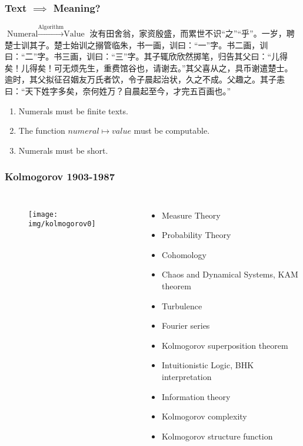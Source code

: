 \documentclass[UTF8,11pt,colorlinks,compress,openany]{beamer}%
\begin{document}
\begin{frame}\frametitle{Text $\implies$ Meaning?}
\begin{block}{$\mbox{Numeral}\xrightarrow{\text{Algorithm}}\mbox{Value}$}
汝有田舍翁，家资殷盛，而累世不识“之”“乎”。一岁，聘楚士训其子。楚士始训之搦管临朱，书一画，训曰：“一”字。书二画，训曰：“二”字。书三画，训曰：“三”字。其子辄欣欣然掷笔，归告其父曰：“儿得矣！儿得矣！可无烦先生，重费馆谷也，请谢去。”其父喜从之，具币谢遣楚士。\\
逾时，其父拟征召姻友万氏者饮，令子晨起治状，久之不成。父趣之。其子恚曰：“天下姓字多矣，奈何姓万？自晨起至今，才完五百画也。”
\end{block}
\begin{enumerate}
	\item Numerals must be finite texts.
	\item The function $numeral\mapsto value$ must be computable.
	\item Numerals must be short.
\end{enumerate}
\end{frame}

\begin{frame}\frametitle{Kolmogorov 1903-1987}
\begin{columns}
\begin{figure}
\texttt{[image: img/kolmogorov0]}%
\end{figure}
\begin{itemize}
	\item Measure Theory
	\item Probability Theory
	\item Cohomology
	\item Chaos and Dynamical Systems, KAM theorem
	\item Turbulence
	\item Fourier series
	\item Kolmogorov superposition theorem
	\item Intuitionistic Logic, BHK interpretation
	\item Information theory
	\item Kolmogorov complexity
	\item Kolmogorov structure function
\end{itemize}
\end{columns}
\end{frame}
\end{document}
